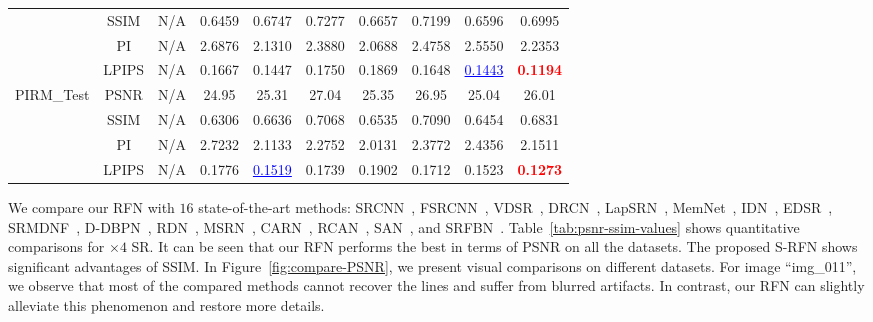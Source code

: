 \documentclass[preprint]{elsarticle}
\begin{document}
\begin{table*}[htpb]
\begin{center}
{\begin{tabular}{|c|c|c|c|c|c|c|c|c|c|}
			& SSIM & N/A & 0.6459 & 0.6747 & 0.7277 & 0.6657 & 0.7199 & 0.6596 & 0.6995\\
			& PI & N/A & 2.6876 & 2.1310 & 2.3880 & 2.0688 & 2.4758 & 2.5550 & 2.2353\\
			& LPIPS & N/A & 0.1667 & 0.1447 & 0.1750 & 0.1869 & 0.1648 & \textcolor{blue}{\underline{0.1443}} & \textcolor{red}{\textbf{0.1194}}\\
			\hline
			\multirow{4}{*}{PIRM\_Test} & PSNR & N/A & 24.95 & 25.31 & 27.04 & 25.35 & 26.95 & 25.04 & 26.01\\
			& SSIM & N/A & 0.6306 & 0.6636 & 0.7068 & 0.6535 & 0.7090 & 0.6454 & 0.6831\\
			& PI & N/A & 2.7232 & 2.1133 & 2.2752 & 2.0131 & 2.3772 & 2.4356 & 2.1511 \\
			& LPIPS & N/A & 0.1776 & \textcolor{blue}{\underline{0.1519}} & 0.1739 & 0.1902 & 0.1712 & 0.1523 & \textcolor{red}{\textbf{0.1273}} \\
			\hline
		\end{tabular} }
	\end{center}
	
\end{table*}




We compare our RFN with $16$ state-of-the-art methods: SRCNN~\cite{SRCNN,SRCNN-Ex}, FSRCNN~\cite{FSRCNN}, VDSR~\cite{VDSR}, DRCN~\cite{DRCN}, LapSRN~\cite{LapSRN}, MemNet~\cite{MemNet}, IDN~\cite{IDN}, EDSR~\cite{EDSR}, SRMDNF~\cite{SRMDNF}, D-DBPN~\cite{DBPN}, RDN~\cite{RDN}, MSRN~\cite{MSRN}, CARN~\cite{CARN}, RCAN~\cite{RCAN}, SAN~\cite{SAN}, and SRFBN~\cite{SRFBN}. Table~\ref{tab:psnr-ssim-values} shows quantitative comparisons for $\times 4$ SR. It can be seen that our RFN performs the best in terms of PSNR on all the datasets. The proposed S-RFN shows significant advantages of SSIM. In Figure~\ref{fig:compare-PSNR}, we present visual comparisons on different datasets. For image ``img\_011'', we observe that most of the compared methods cannot recover the lines and suffer from blurred artifacts. In contrast, our RFN can slightly alleviate this phenomenon and restore more details. 
\end{document}
